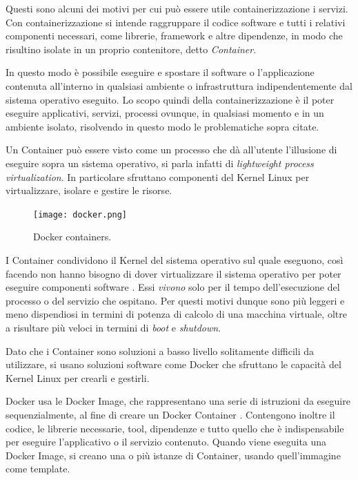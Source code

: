 Questi sono alcuni dei motivi per cui può essere utile containerizzazione i servizi.
Con containerizzazione si intende raggruppare  il codice software e tutti i relativi componenti necessari, come librerie, framework e altre dipendenze, in modo che risultino isolate in un proprio contenitore, detto \textit{Container}.

In questo modo è possibile eseguire e spostare il software o l'applicazione contenuta all'interno in qualsiasi ambiente o infrastruttura indipendentemente dal sistema operativo eseguito.
Lo scopo quindi della containerizzazione è il poter eseguire applicativi, servizi, processi ovunque, in qualsiasi momento e in un ambiente isolato, risolvendo in questo modo le problematiche sopra citate.

Un Container può essere visto come un processo che dà all'utente l'illusione di eseguire sopra un sistema operativo, si parla infatti di \textit{lightweight process virtualization}. In particolare sfruttano componenti del Kernel Linux per virtualizzare, isolare e gestire le risorse.
\begin{figure}[hbtp]
    \centering
    \texttt{[image: docker.png]}
    \caption{Docker containers.}
    \label{fig:docker}
\end{figure}
I Container condividono il Kernel del sistema operativo sul quale eseguono, così facendo non hanno bisogno di dover virtualizzare il sistema operativo per poter eseguire componenti software \cite{mouat2015using}.  
Essi \textit{vivono} solo per il tempo dell'esecuzione del processo o del servizio che ospitano.
Per questi motivi dunque sono  più leggeri e  meno dispendiosi in termini di potenza di calcolo di una macchina virtuale, oltre a risultare più veloci in termini di \textit{boot} e \textit{shutdown}.

Dato che i Container sono soluzioni a basso livello solitamente difficili da utilizzare, si usano soluzioni software come Docker  \cite{docker}  che sfruttano le capacità del Kernel Linux per crearli e gestirli.

Docker usa le Docker Image, che rappresentano una serie di istruzioni da eseguire sequenzialmente, al fine di creare un Docker Container \cite{mouat2015using}. Contengono inoltre il codice, le librerie necessarie, tool, dipendenze e tutto quello che è indispensabile per eseguire l'applicativo o il servizio contenuto. Quando viene eseguita una Docker Image, si creano una o più istanze di Container, usando quell'immagine come template.


